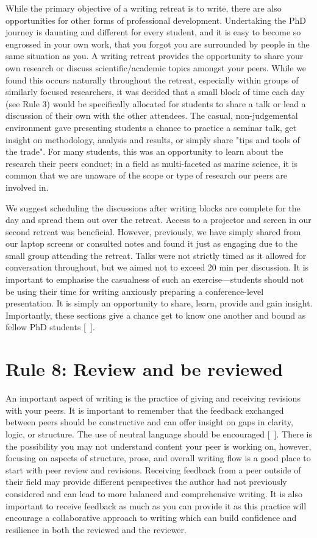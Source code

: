 \documentclass[10pt,letterpaper]{article}
\begin{document}
While the primary objective of a writing retreat is to write, there are also opportunities for other forms of professional development. Undertaking the PhD journey is daunting and different for every student, and it is easy to become so engrossed in your own work, that you forgot you are surrounded by people in the same situation as you. A writing retreat provides the opportunity to share your own research or discuss scientific/academic topics amongst your peers. While we found this occurs naturally throughout the retreat, especially within groups of similarly focused researchers, it was decided that a small block of time each day (see Rule 3) would be specifically allocated for students to share a talk or lead a discussion of their own with the other attendees. The casual, non-judgemental environment gave presenting students a chance to practice a seminar talk, get insight on methodology, analysis and results, or simply share "tips and tools of the trade". For many students, this was an opportunity to learn about the research their peers conduct; in a field as multi-faceted as marine science, it is common that we are unaware of the scope or type of research our peers are involved in.

We suggest scheduling the discussions after writing blocks are complete for the day and spread them out over the retreat. Access to a projector and screen in our second retreat was beneficial. However, previously, we have simply shared from our laptop screens or consulted notes and found it just as engaging due to the small group attending the retreat. Talks were not strictly timed as it allowed for conversation throughout, but we aimed not to exceed 20 min per discussion. It is important to emphasise the casualness of such an exercise---students should not be using their time for writing anxiously preparing a conference-level presentation. It is simply an opportunity to share, learn, provide and gain insight. Importantly, these sections give a chance get to know one another and bound as fellow PhD students [~\cite{bernery, omeara}].

\section*{Rule 8: Review and be reviewed}

An important aspect of writing is the practice of giving and receiving revisions with your peers. It is important to remember that the feedback exchanged between peers should be constructive and can offer insight on gaps in clarity, logic, or structure. The use of neutral language should be encouraged [~\cite{parsons2021}]. There is the possibility you may not understand content your peer is working on, however, focusing on aspects of structure, prose, and overall writing flow is a good place to start with peer review and revisions. Receiving feedback from a peer outside of their field may provide different perspectives the author had not previously considered and can lead to more balanced and comprehensive writing. It is also important to receive feedback as much as you can provide it as this practice will encourage a collaborative approach to writing which can build confidence and resilience in both the reviewed and the reviewer.
\end{document}

